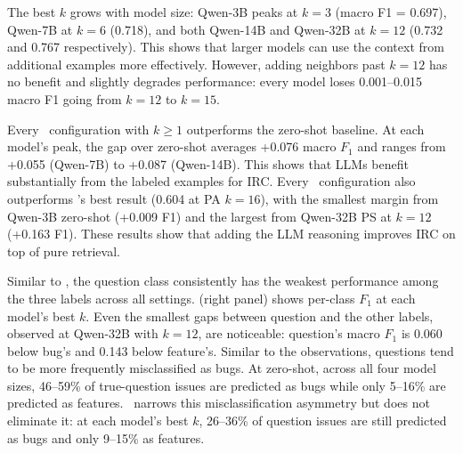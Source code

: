 The best $k$ grows with model size: Qwen-3B peaks at $k{=}3$ (macro F1 = 0.697), Qwen-7B at $k{=}6$ (0.718), and both Qwen-14B and Qwen-32B at $k{=}12$ (0.732 and 0.767 respectively). This shows that larger models can use the context from additional examples more effectively. However, adding neighbors past $k{=}12$ has no benefit and slightly degrades performance: every model loses 0.001--0.015 macro F1 going from $k{=}12$ to $k{=}15$.

Every \ragtag\ configuration with $k{\ge}1$ outperforms the zero-shot baseline. At each model's peak, the gap over zero-shot averages +0.076 macro $F_1$ and ranges from +0.055 (Qwen-7B) to +0.087 (Qwen-14B). This shows that LLMs benefit substantially from the labeled examples for IRC.
Every \ragtag\ configuration also outperforms \votag's best result (0.604 at PA $k{=}16$), with the smallest margin from Qwen-3B zero-shot (+0.009 F1) and the largest from Qwen-32B PS at $k{=}12$ (+0.163 F1). These results show that adding the LLM reasoning improves IRC on top of pure retrieval.

Similar to \votag, the question class consistently has the weakest performance among the three labels across all \ragtag settings.  (right panel) shows per-class $F_1$ at each model's best $k$. Even the smallest gaps between question and the other labels, observed at Qwen-32B with $k{=}12$, are noticeable: question's macro $F_1$ is 0.060 below bug's and 0.143 below feature's. Similar to the \votag observations, questions tend to be more frequently misclassified as bugs. At zero-shot, across all four model sizes, 46--59\% of true-question issues are predicted as bugs while only 5--16\% are predicted as features. \ragtag\ narrows this misclassification asymmetry but does not eliminate it: at each model's best $k$, 26--36\% of question issues are still predicted as bugs and only 9--15\% as features. 

